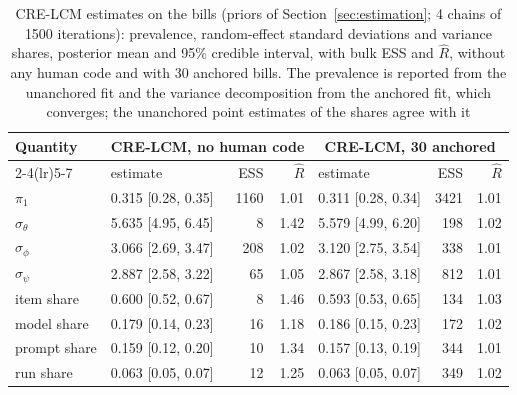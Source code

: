\begin{table}[htbp]
\centering
\footnotesize
\setlength{\tabcolsep}{4pt}
\caption{CRE-LCM estimates on the bills (priors of Section~\ref{sec:estimation}; 4 chains of 1500 iterations): prevalence, random-effect standard deviations and variance shares, posterior mean and 95\% credible interval, with bulk ESS and $\widehat{R}$, without any human code and with 30 anchored bills. The prevalence is reported from the unanchored fit and the variance decomposition from the anchored fit, which converges; the unanchored point estimates of the shares agree with it}\label{tab:app_shares}
\begin{tabular}{llrrlrr}
\toprule
Quantity & \multicolumn{3}{c}{CRE-LCM, no human code} & \multicolumn{3}{c}{CRE-LCM, 30 anchored} \\
\cmidrule(lr){2-4}\cmidrule(lr){5-7}
 & estimate & ESS & $\widehat{R}$ & estimate & ESS & $\widehat{R}$ \\
\midrule
$\pi_1$ & 0.315 [0.28, 0.35] & 1160 & 1.01 & 0.311 [0.28, 0.34] & 3421 & 1.01 \\
$\sigma_\theta$ & 5.635 [4.95, 6.45] & 8 & 1.42 & 5.579 [4.99, 6.20] & 198 & 1.02 \\
$\sigma_\phi$ & 3.066 [2.69, 3.47] & 208 & 1.02 & 3.120 [2.75, 3.54] & 338 & 1.01 \\
$\sigma_\psi$ & 2.887 [2.58, 3.22] & 65 & 1.05 & 2.867 [2.58, 3.18] & 812 & 1.01 \\
item share & 0.600 [0.52, 0.67] & 8 & 1.46 & 0.593 [0.53, 0.65] & 134 & 1.03 \\
model share & 0.179 [0.14, 0.23] & 16 & 1.18 & 0.186 [0.15, 0.23] & 172 & 1.02 \\
prompt share & 0.159 [0.12, 0.20] & 10 & 1.34 & 0.157 [0.13, 0.19] & 344 & 1.01 \\
run share & 0.063 [0.05, 0.07] & 12 & 1.25 & 0.063 [0.05, 0.07] & 349 & 1.02 \\
\bottomrule
\end{tabular}
\end{table}
